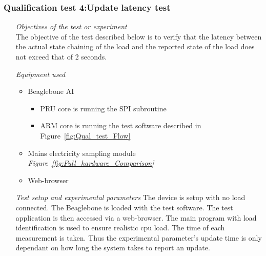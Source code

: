 \subsubsection{Qualification test 4:Update latency test}
\label{sec:Latency_test}
\begin{itemize}
    \item [\emph{Objectives of the test or experiment}]\mbox{}\\
    The objective of the test described below is to verify that the latency between the actual state chaining of the load and the reported state of the load does not exceed that of 2 seconds.
    \item [\emph{Equipment used}]\mbox{}
    \begin{itemize} 
        \item Beaglebone AI 
        \begin{itemize}
            \item PRU core is running the SPI subroutine 
            \item ARM core is running the test software described in Figure~\ref{fig:Qual_test_Flow}
        \end{itemize}
        \item Mains electricity sampling module \emph{Figure~\ref{fig:Full_hardware_Comparison}}
        \item Web-browser
    \end{itemize}
    \item [\emph{Test setup and experimental parameters}]\mbox{}
    The device is setup with no load connected. The Beaglebone is loaded with the test software. The test application is then accessed via a web-browser. The main program with load identification is used to ensure realistic cpu load. The time of each measurement is taken. Thus the experimental parameter's update time is only dependant on how long the system takes to report an update.
    

\end{itemize}
